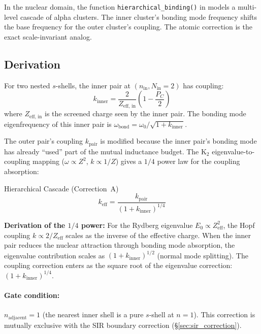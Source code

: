 In the nuclear domain, the function \texttt{hierarchical\_binding()} in  models a multi-level cascade of alpha clusters.  The inner cluster's bonding mode frequency shifts the base frequency for the outer cluster's coupling.  The atomic correction is the exact scale-invariant analog.

\subsection{Derivation}

For two nested $s$-shells, the inner pair at $(n_\text{in}, N_\text{in} = 2)$ has coupling:
\begin{equation}
    k_\text{inner} = \frac{2}{Z_\text{eff, in}}\left(1 - \frac{P_C}{2}\right)
    \label{eq:k_inner}
\end{equation}
where $Z_\text{eff, in}$ is the screened charge seen by the inner pair.  The bonding mode eigenfrequency of this inner pair is $\omega_\text{bond} = \omega_0 / \sqrt{1 + k_\text{inner}}$.

The outer pair's coupling $k_\text{pair}$ is modified because the inner pair's bonding mode has already ``used'' part of the mutual inductance budget.  The K$_2$ eigenvalue-to-coupling mapping ($\omega \propto Z^2$, $k \propto 1/Z$) gives a $1/4$ power law for the coupling absorption:
\begin{resultbox}{Hierarchical Cascade (Correction~A)}
\begin{equation}
    \boxed{k_\text{eff} = \frac{k_\text{pair}}{(1 + k_\text{inner})^{1/4}}}
    \label{eq:k_eff_cascade}
\end{equation}
\end{resultbox}

\noindent\textbf{Derivation of the $1/4$ power:}
For the Rydberg eigenvalue $E_0 \propto Z_\text{eff}^2$, the Hopf coupling $k \propto 2/Z_\text{eff}$ scales as the inverse of the effective charge.  When the inner pair reduces the nuclear attraction through bonding mode absorption, the eigenvalue contribution scales as $(1 + k_\text{inner})^{1/2}$ (normal mode splitting).  The coupling correction enters as the square root of the eigenvalue correction: $(1 + k_\text{inner})^{1/4}$.

\paragraph{Gate condition:}  $n_\text{adjacent} = 1$ (the nearest inner shell is a pure $s$-shell at $n = 1$).  This correction is mutually exclusive with the SIR boundary correction (\S\ref{sec:sir_correction}).

